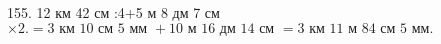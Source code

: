 155. 12 км 42 см :4+5 м 8 дм 7 см$\times2.=3\text{ км }10\text{ см }5\text{ мм }+10\text{ м }16\text{ дм }14\text{ см }=3\text{ км }11\text{ м }84\text{ см }5\text{ мм.}$\\
